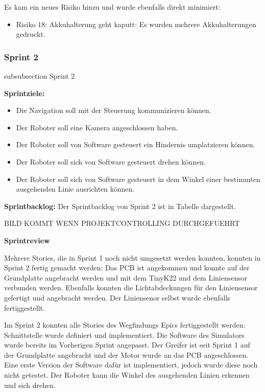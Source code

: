 Es kam ein neues Risiko hinzu und wurde ebenfalls direkt minimiert:
\begin{itemize}
    \item Risiko 18: Akkuhalterung geht kaputt: Es wurden mehrere Akkuhalterungen gedruckt.
\end{itemize}


\newpage



\subsubsection*{Sprint 2}
    {subsubsection}
    {Sprint 2}
    
\textbf{Sprintziele:}
\begin{itemize}
    \item Die Navigation soll mit der Steuerung kommunizieren können.
    \item Der Roboter soll eine Kamera angeschlossen haben.
    \item Der Roboter soll von Software gesteuert ein Hindernis umplatzieren können.
    \item Der Roboter soll sich von Software gesteuert drehen können.
    \item Der Roboter soll sich von Software gesteuert in dem Winkel einer bestimmten ausgehenden Linie ausrichten können.
\end{itemize}

\textbf{Sprintbacklog:} Der Sprintbacklog von Sprint 2 ist in Tabelle 
dargestellt.

BILD KOMMT WENN PROJEKTCONTROLLING DURCHGEFUEHRT


\textbf{Sprintreview}

Mehrere Stories, die in Sprint 1 noch nicht umgesetzt werden konnten, konnten in Sprint 2 fertig gemacht werden: Das PCB ist angekommen und konnte auf der Grundplatte angebracht werden und mit dem TinyK22 und dem Liniensensor verbunden werden. Ebenfalls konnten die Lichtabdeckungen für den Liniensensor gefertigt und angebracht werden. Der Liniensenor selbst wurde ebenfalls fertiggestellt.

Im Sprint 2 konnten alle Stories des Wegfindungs Epics fertiggestellt werden: Schnittstelle wurde definiert und implementiert. Die Software des Simulators wurde bereits im Vorherigen Sprint angepasst.
Der Greifer ist seit Sprint 1 auf der Grundplatte angebracht und der Motor wurde an das PCB angeschlossen. Eine erste Version der Software dafür ist implementiert, jedoch wurde diese noch nicht getestet. Der Roboter kann die Winkel des ausgehenden Linien erkennen und sich drehen.

